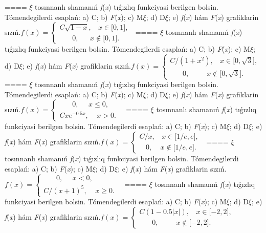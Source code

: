 ====
$\xi$ tosınnanlı shamanıń \emph{f}(\emph{x}) tıǵızlıq funkciyasi berilgen bolsin. Tómendegilerdi esaplań: a) C; b) \emph{F}(\emph{x}); c) M$\xi$; d) D$\xi$; e) \emph{f}(\emph{x}) hám \emph{F}(\emph{x}) grafiklarin sızıń.\(f(x) = \left\{ \begin{matrix}
C\sqrt{1 - x},\ \ \ \ x \in \lbrack 0,1\rbrack, \\
\ \ \ \ \ \ \ \ 0,\ \ \ \ \ \ \ x \notin \lbrack 0,1\rbrack.\ \ 
\end{matrix} \right.\ \)
====
$\xi$ tosınnanlı shamanıń \emph{f}(\emph{x}) tıǵızlıq funkciyasi berilgen bolsin. Tómendegilerdi esaplań: a) C; b) \emph{F}(\emph{x}); c) M$\xi$; d) D$\xi$; e) \emph{f}(\emph{x}) hám \emph{F}(\emph{x}) grafiklarin sızıń.\(f(x) = \left\{ \begin{matrix}
C/(1 + x^{2}),\ \ \ \ x \in \lbrack 0,\sqrt{3}\rbrack, \\
\ \ \ \ \ \ \ \ 0,\ \ \ \ \ \ \ \ \ \ \ x \notin \lbrack 0,\sqrt{3}\rbrack.\ \ 
\end{matrix} \right.\ \)
====
$\xi$ tosınnanlı shamanıń \emph{f}(\emph{x}) tıǵızlıq funkciyasi berilgen bolsin. Tómendegilerdi esaplań: a) C; b) \emph{F}(\emph{x}); c) M$\xi$; d) D$\xi$; e) \emph{f}(\emph{x}) hám \emph{F}(\emph{x}) grafiklarin sızıń.\(f(x) = \left\{ \begin{matrix}
\ \ \ \ \ \ \ \ 0,\ \ \ \ \ \ x \leq 0, \\
Cxe^{- 0.5x},\ \ \ \ \ x > 0.\ \ 
\end{matrix} \right.\ \)
====
$\xi$ tosınnanlı shamanıń \emph{f}(\emph{x}) tıǵızlıq funkciyasi berilgen bolsin. Tómendegilerdi esaplań: a) C; b) \emph{F}(\emph{x}); c) M$\xi$; d) D$\xi$; e) \emph{f}(\emph{x}) hám \emph{F}(\emph{x}) grafiklarin sızıń.\(f(x) = \left\{ \begin{matrix}
C/x,\ \ \ \ x \in \lbrack 1/e,e\rbrack, \\
\ \ \ \ 0,\ \ \ \ \ x \notin \lbrack 1/e,e\rbrack.\ \ 
\end{matrix} \right.\ \)
====
$\xi$ tosınnanlı shamanıń \emph{f}(\emph{x}) tıǵızlıq funkciyasi berilgen bolsin. Tómendegilerdi esaplań: a) C; b) \emph{F}(\emph{x}); c) M$\xi$; d) D$\xi$; e) \emph{f}(\emph{x}) hám \emph{F}(\emph{x}) grafiklarin sızıń.\(f(x) = \left\{ \begin{matrix}
\ \ \ \ \ \ \ \ 0,\ \ \ \ \ \ x < 0, \\
C/(x + 1)^{5},\ \ \ \ \ x \geq 0.\ \ 
\end{matrix} \right.\ \)
====
$\xi$ tosınnanlı shamanıń \emph{f}(\emph{x}) tıǵızlıq funkciyasi berilgen bolsin. Tómendegilerdi esaplań: a) C; b) \emph{F}(\emph{x}); c) M$\xi$; d) D$\xi$; e) \emph{f}(\emph{x}) hám \emph{F}(\emph{x}) grafiklarin sızıń.\(f(x) = \left\{ \begin{matrix}
C(1 - 0.5|x|),\ \ \ \ x \in \lbrack - 2,2\rbrack, \\
\ \ \ \ \ \ \ \ 0,\ \ \ \ \ \ \ \ \ \ \ x \notin \lbrack - 2,2\rbrack.\ \ 
\end{matrix} \right.\ \)
